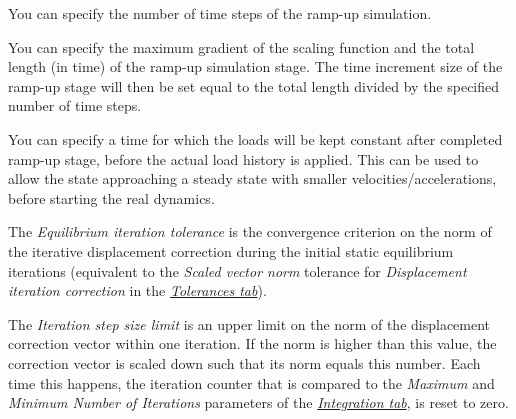 {%

\begin{bulletlist}
  \setcounter{enumi}{4}
\item
  You can specify the number of time steps of the ramp-up simulation.
\item
  You can specify the maximum gradient of the scaling function and the
  total length (in time) of the ramp-up simulation stage. The time
  increment size of the ramp-up stage will then be set equal to the
  total length divided by the specified number of time steps.
\item
  You can specify a time for which the loads will be kept constant after
  completed ramp-up stage, before the actual load history is applied.
  This can be used to allow the state approaching a steady state with
  smaller velocities/accelerations, before starting the real dynamics.
\end{bulletlist}

\clearpage
The {\sl Equilibrium iteration tolerance} is the convergence criterion on the
norm of the iterative displacement correction during the initial static
equilibrium iterations (equivalent to the {\sl Scaled vector norm} tolerance
for {\sl Displacement iteration correction} in the
\protect\hyperlink{tolerances-tab}{\sl Tolerances tab}).

The {\sl Iteration step size limit} is an upper limit on the norm of the
displacement correction vector within one iteration. If the norm is higher than
this value, the correction vector is scaled down such that its norm equals this
number. Each time this happens, the iteration counter that is compared to the
{\sl Maximum} and {\sl Minimum Number of Iterations} parameters of the
\protect\hyperlink{integration-tab}{\sl Integration tab}, is reset to zero.



}
